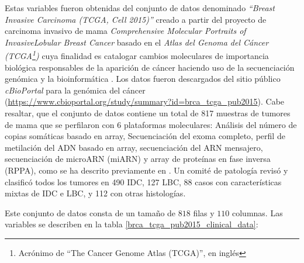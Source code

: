 Estas variables fueron obtenidas del conjunto de datos denominado \textit{“Breast Invasive Carcinoma (TCGA, Cell 2015)”} creado a partir del proyecto de carcinoma invasivo de mama \textit{Comprehensive Molecular Portraits of InvasiveLobular Breast Cancer} \cite{Ciriello2015} basado en el \textit {Atlas del Genoma del Cáncer (TCGA\footnote{Acrónimo de “The Cancer Genome Atlas (TCGA)”, en inglés })} cuya finalidad es catalogar cambios moleculares de importancia biológica responsables de la aparición de cáncer haciendo uso de la secuenciación genómica y la bioinformática \cite{TCGA2023}. Los datos fueron descargados del sitio público \textit{cBioPortal} para la genómica del cáncer  (\url{https://www.cbioportal.org/study/summary?id=brca_tcga_pub2015}). Cabe resaltar, que el conjunto de datos contiene un total de 817 muestras de tumores de mama que  se perfilaron con 6 plataformas moleculares: Análisis del número de copias somáticas basado en array, Secuenciación del exoma completo, perfil de metilación del ADN basado en array, secuenciación del ARN mensajero, secuenciación de microARN (miARN) y array de proteínas en fase inversa (RPPA), como se ha descrito previamente en \cite{Bass2014}. Un comité de patología revisó y clasificó todos los tumores en 490 IDC, 127 LBC, 88 casos con características mixtas de IDC e LBC, y 112 con otras histologías.

Este conjunto de datos consta de un tamaño de $818$ filas y $110$ columnas. Las variables se describen en la tabla \ref{brca_tcga_pub2015_clinical_data}: 

